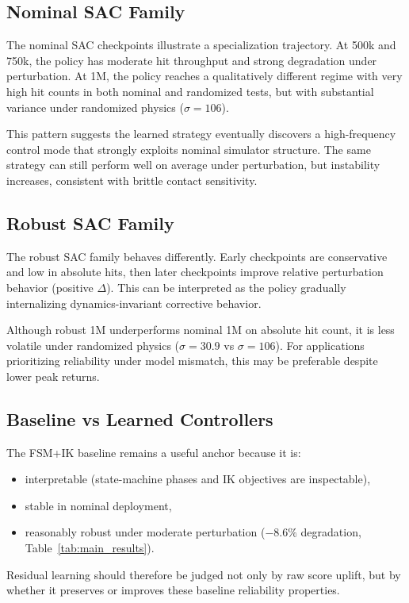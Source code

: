 \documentclass[10pt,twocolumn,letterpaper]{article}
\begin{document}
\subsection{Nominal SAC Family}
The nominal SAC checkpoints illustrate a specialization trajectory. At 500k and 750k, the policy has moderate hit throughput and strong degradation under perturbation. At 1M, the policy reaches a qualitatively different regime with very high hit counts in both nominal and randomized tests, but with substantial variance under randomized physics ($\sigma = 106$).

This pattern suggests the learned strategy eventually discovers a high-frequency control mode that strongly exploits nominal simulator structure. The same strategy can still perform well on average under perturbation, but instability increases, consistent with brittle contact sensitivity.

\subsection{Robust SAC Family}
The robust SAC family behaves differently. Early checkpoints are conservative and low in absolute hits, then later checkpoints improve relative perturbation behavior (positive $\Delta$). This can be interpreted as the policy gradually internalizing dynamics-invariant corrective behavior.

Although robust 1M underperforms nominal 1M on absolute hit count, it is less volatile under randomized physics ($\sigma = 30.9$ vs $\sigma = 106$). For applications prioritizing reliability under model mismatch, this may be preferable despite lower peak returns.

\subsection{Baseline vs Learned Controllers}
The FSM+IK baseline remains a useful anchor because it is:
\begin{itemize}[leftmargin=*,noitemsep]
    \item interpretable (state-machine phases and IK objectives are inspectable),
    \item stable in nominal deployment,
    \item reasonably robust under moderate perturbation ($-8.6\%$ degradation, Table~\ref{tab:main_results}).
\end{itemize}
Residual learning should therefore be judged not only by raw score uplift, but by whether it preserves or improves these baseline reliability properties.
\end{document}
